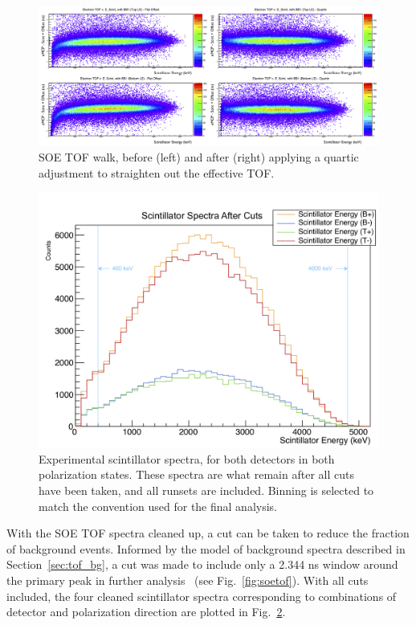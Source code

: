 \begin{figure}[h!!tb]
	\centering
	\includegraphics[width=.999\linewidth]
	{Figures/WalkAdjust.png}
	\caption[SOE TOF Walk and Correction]{SOE TOF walk, before (left) and after (right) applying a quartic adjustment to straighten out the effective TOF.}	
	\label{fig:WalkAdjust}
\end{figure}


\begin{figure}[h!!tb]
	\centering
	\includegraphics[width=.999\linewidth]
	{Figures/experimental_scintspectra_lin.png}
	\caption[Experimental Scintillator Spectra]{Experimental scintillator spectra, for both detectors in both polarization states.  These spectra are what remain after all cuts have been taken, and all runsets are included.  Binning is selected to match the convention used for the final analysis.}	
	\label{fig:scintspectra}
\end{figure}

With the SOE TOF spectra cleaned up, a cut can be taken to reduce the fraction of background events.  Informed by the model of background spectra described in Section~\ref{sec:tof_bg}, a cut was made to include only a 2.344 ns window around the primary peak in further analysis~ (see Fig.~\ref{fig:soetof}).  With all cuts included, the four cleaned scintillator spectra corresponding to combinations of detector and polarization direction are plotted in Fig.~\ref{fig:scintspectra}.




